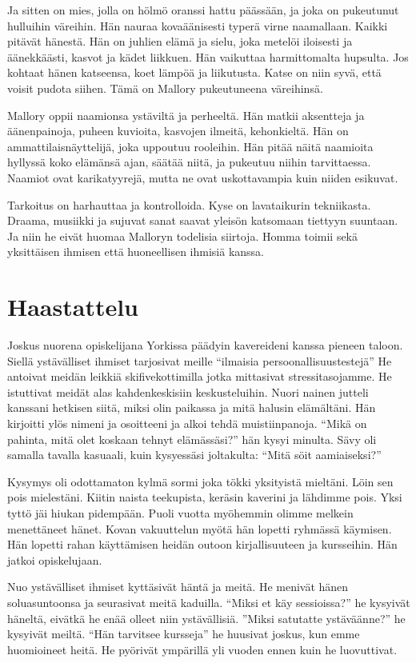 Ja sitten on mies, jolla on hölmö oranssi hattu päässään, ja joka on pukeutunut hulluihin väreihin. Hän nauraa kovaäänisesti typerä virne naamallaan. Kaikki pitävät hänestä. Hän on juhlien elämä ja sielu, joka metelöi iloisesti ja äänekkäästi, kasvot ja kädet liikkuen. Hän vaikuttaa harmittomalta hupsulta. Jos kohtaat hänen katseensa, koet lämpöä ja liikutusta. Katse on niin syvä, että voisit pudota siihen. Tämä on Mallory pukeutuneena väreihinsä.

Mallory oppii naamionsa ystäviltä ja perheeltä. Hän matkii aksentteja ja äänenpainoja, puheen kuvioita, kasvojen ilmeitä, kehonkieltä. Hän on ammattilaisnäyttelijä, joka uppoutuu rooleihin. Hän pitää näitä naamioita hyllyssä koko elämänsä ajan, säätää niitä, ja pukeutuu niihin tarvittaessa. Naamiot ovat karikatyyrejä, mutta ne ovat uskottavampia kuin niiden esikuvat.

Tarkoitus on harhauttaa ja kontrolloida. Kyse on lavataikurin tekniikasta. Draama, musiikki ja sujuvat sanat saavat yleisön katsomaan tiettyyn suuntaan. Ja niin he eivät huomaa Malloryn todelisia siirtoja. Homma toimii sekä yksittäisen ihmisen että huoneellisen ihmisiä kanssa.

\section{Haastattelu}

Joskus nuorena opiskelijana Yorkissa päädyin kavereideni kanssa pieneen taloon. Siellä ystävälliset ihmiset tarjosivat meille ``ilmaisia persoonallisuustestejä'' He antoivat meidän leikkiä skifivekottimilla jotka mittasivat stressitasojamme. He istuttivat meidät alas kahdenkeskisiin keskusteluihin. Nuori nainen jutteli kanssani hetkisen siitä, miksi olin paikassa ja mitä halusin elämältäni. Hän kirjoitti ylös nimeni ja osoitteeni ja alkoi tehdä muistiinpanoja. ``Mikä on pahinta, mitä olet koskaan tehnyt elämässäsi?'' hän kysyi minulta. Sävy oli samalla tavalla kasuaali, kuin kysyessäsi joltakulta: ``Mitä söit aamiaiseksi?''

Kysymys oli odottamaton kylmä sormi joka tökki yksityistä mieltäni. Löin sen pois mielestäni. Kiitin naista teekupista, keräsin kaverini ja lähdimme pois. Yksi tyttö jäi hiukan pidempään. Puoli vuotta myöhemmin olimme melkein menettäneet hänet. Kovan vakuuttelun myötä hän lopetti ryhmässä käymisen. Hän lopetti rahan käyttämisen heidän outoon kirjallisuuteen ja kursseihin. Hän jatkoi opiskelujaan.

Nuo ystävälliset ihmiset kyttäsivät häntä ja meitä. He menivät hänen soluasuntoonsa ja seurasivat meitä kaduilla. ``Miksi et käy sessioissa?'' he kysyivät häneltä, eivätkä he enää olleet niin ystävällisiä. ''Miksi satutatte ystäväänne?'' he kysyivät meiltä. ``Hän tarvitsee kursseja\vmq{,}'' he huusivat joskus, kun emme huomioineet heitä. He pyörivät ympärillä yli vuoden ennen kuin he luovuttivat.

